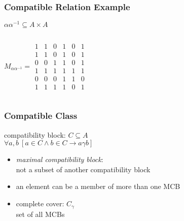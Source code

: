 \documentclass[dvipsnames]{beamer}
\begin{document}
\begin{frame}
  \frametitle{Compatible Relation Example}

  \begin{example}
    $\alpha \alpha^{-1} \subseteq A \times A$

    \begin{columns}
      \[ M_{\alpha \alpha^{-1}}= \begin{array}{|cccccc|}
          1  &  1  &  0  &  1  &  0  &  1\\
          1  &  1  &  0  &  1  &  0  &  1\\
          0  &  0  &  1  &  1  &  0  &  1\\
          1  &  1  &  1  &  1  &  1  &  1\\
          0  &  0  &  0  &  1  &  1  &  0\\
          1  &  1  &  1  &  1  &  0  &  1
        \end{array} \]

      \begin{center}
      \end{center}
    \end{columns}
  \end{example}
\end{frame}

\begin{frame}
  \frametitle{Compatible Class}

  \begin{definition}
    \alert{compatibility block}: $C \subseteq A$\\
      $\forall a,b~[a \in C \wedge b \in C \rightarrow a \gamma b]$
  \end{definition}

  \pause
  \medskip
  \begin{itemize}
    \item \emph{maximal compatibility block}:\\
      not a subset of another compatibility block

    \pause
    \item an element can be a member of more than one MCB

    \pause
    \medskip
    \item \alert{complete cover}: $C_\gamma$\\
      set of all MCBs
  \end{itemize}
\end{frame}
\end{document}

